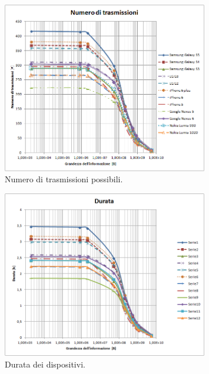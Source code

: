 \begin{figure}[t]
	\centering
	\includegraphics[width=0.8\textwidth, keepaspectratio]{Images/studio_energetico/numero_trasmissioni}
	\caption[Numero di trasmissioni.]{Numero di trasmissioni possibili.}
	\label{fig:numero_trasmissioni}
\end{figure}
\begin{figure}[t]
	\centering
	\includegraphics[width=0.8\textwidth, keepaspectratio]{Images/studio_energetico/durata}
	\caption[Durata]{Durata dei dispositivi.}
	\label{fig:durata}
\end{figure}